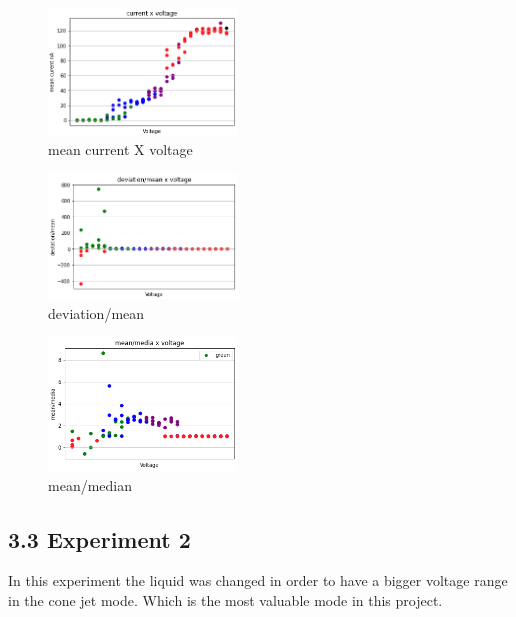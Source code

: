     \begin{multicols}{3}

        \begin{figure}[H]
            \center
            \includegraphics[width=5cm]{images/images_folder_3/data2_sjaaksgraph1.png}
            \caption{mean current X voltage}
        \end{figure}


        \begin{figure}[H]
            \center
            \includegraphics[width=5cm]{images/images_folder_3/data2_sjaaksgraph2.png}
            \caption{deviation/mean}
        \end{figure}


        \begin{figure}[H]
            \center
            \includegraphics[width=5cm]{images/images_folder_3/data2_sjaaksgraph3.png}
            \caption{mean/median}
        \end{figure}

    \end{multicols}



\subsection*{3.3 Experiment 2}

In this experiment the liquid was changed in order to have a bigger voltage range in the cone jet mode. Which is the most valuable mode in this project.

